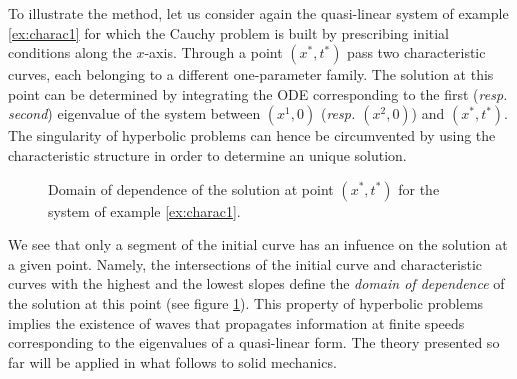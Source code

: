 To illustrate the method, let us consider again the quasi-linear system of example \ref{ex:charac1} for which the Cauchy problem is built by prescribing initial conditions along the $x$-axis. Through a point $(x^*,t^*)$ pass two characteristic curves, each belonging to a different one-parameter family. The solution at this point can be determined by integrating the ODE corresponding to the first (\textit{resp. second}) eigenvalue of the system between $(x^1,0)$ (\textit{resp. $(x^2,0)$}) and $(x^*,t^*)$. The singularity of hyperbolic problems can hence be circumvented by using the characteristic structure in order to determine an unique solution. 
\begin{figure}[h]
  \centering
  
  \caption{Domain of dependence of the solution at point $(x^*,t^*)$ for the system of example \ref{ex:charac1}.}
  \label{fig:charac_method2x2}
\end{figure}
We see that only a segment of the initial curve has an infuence on the solution at a given point. Namely, the intersections of the initial curve and characteristic curves with the highest and the lowest slopes define the \textit{domain of dependence} of the solution at this point (see figure \ref{fig:charac_method2x2}). This property of hyperbolic problems implies the existence of waves that propagates information at finite speeds corresponding to the eigenvalues of a quasi-linear form. The theory presented so far will be applied in what follows to solid mechanics.



